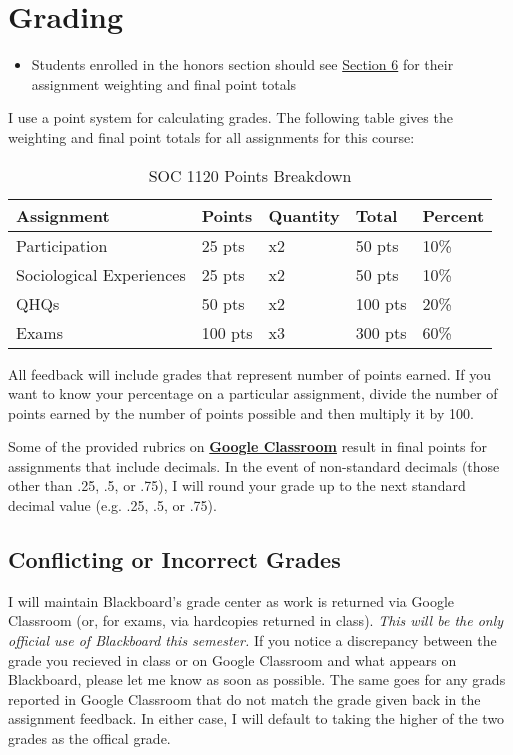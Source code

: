 \documentclass[]{book}
\newenvironment{rmdblock}[1]
  {\begin{shaded*}
  \begin{itemize}
  \renewcommand{\labelitemi}{
    \raisebox{-.7\height}[0pt][0pt]{
      {\setkeys{Gin}{width=3em,keepaspectratio}\texttt{[image: images/\#1]}}
    }
  }
  \item
  }
  {
  \end{itemize}
  \end{shaded*}
  }
\newenvironment{rmdwarning}
  {\begin{rmdblock}{warning}}
  {\end{rmdblock}}
\theoremstyle{definition}
\theoremstyle{definition}
\theoremstyle{definition}
\theoremstyle{remark}
\begin{document}
\hypertarget{grading}{%
\section{Grading}\label{grading}}

\begin{rmdwarning}
Students enrolled in the honors section should see
\href{/honors-overview.html}{Section 6} for their assignment weighting
and final point totals
\end{rmdwarning}

I use a point system for calculating grades. The following table gives
the weighting and final point totals for all assignments for this
course:

\begin{table}

\caption{\label{tab:unnamed-chunk-7}SOC 1120 Points Breakdown}
\centering
\begin{tabular}[t]{lllll}
\toprule
Assignment & Points & Quantity & Total & Percent\\
\midrule
Participation & 25 pts & x2 & 50 pts & 10\%\\
Sociological Experiences & 25 pts & x2 & 50 pts & 10\%\\
QHQs & 50 pts & x2 & 100 pts & 20\%\\
Exams & 100 pts & x3 & 300 pts & 60\%\\
\bottomrule
\end{tabular}
\end{table}

All feedback will include grades that represent number of points earned.
If you want to know your percentage on a particular assignment, divide
the number of points earned by the number of points possible and then
multiply it by 100.

Some of the provided rubrics on
\textbf{\href{https://classroom.google.com}{Google Classroom}} result in
final points for assignments that include decimals. In the event of
non-standard decimals (those other than .25, .5, or .75), I will round
your grade up to the next standard decimal value (e.g. .25, .5, or .75).

\hypertarget{conflicting-or-incorrect-grades}{%
\subsection{Conflicting or Incorrect
Grades}\label{conflicting-or-incorrect-grades}}

I will maintain Blackboard's grade center as work is returned via Google
Classroom (or, for exams, via hardcopies returned in class). \emph{This
will be the only official use of Blackboard this semester.} If you
notice a discrepancy between the grade you recieved in class or on
Google Classroom and what appears on Blackboard, please let me know as
soon as possible. The same goes for any grads reported in Google
Classroom that do not match the grade given back in the assignment
feedback. In either case, I will default to taking the higher of the two
grades as the offical grade.
\end{document}

